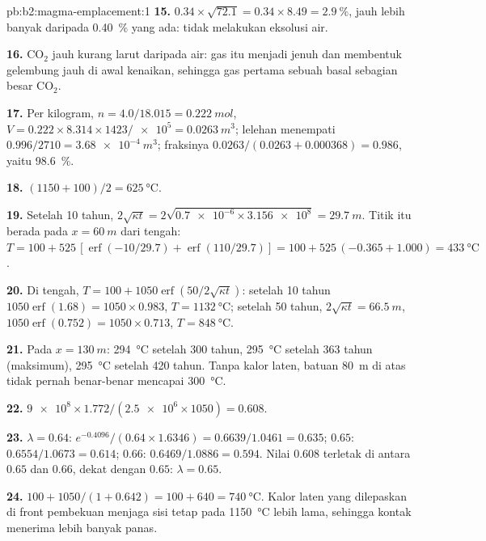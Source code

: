 \begin{solution}{pb:b2:magma-emplacement:1}
\textbf{15.} $0.34\times\sqrt{72.1} = 0.34\times8.49 = \qty{2.9}{\percent}$, jauh lebih banyak daripada
\qty{0.40}{\percent} yang ada:   tidak melakukan eksolusi air.

\textbf{16.} CO$_2$ jauh kurang larut daripada air: gas itu menjadi jenuh dan membentuk gelembung
jauh di awal kenaikan, sehingga gas pertama sebuah basal sebagian besar CO$_2$.

\textbf{17.} Per kilogram, $n = 4.0/18.015 = \qty{0.222}{mol}$, $V = 0.222\times8.314\times1423/
\num{e5} = \qty{0.0263}{m^3}$; lelehan menempati $0.996/2710 = \qty{3.68e-4}{m^3}$;
fraksinya $0.0263/(0.0263 + 0.000368) = 0.986$, yaitu \qty{98.6}{\percent}.

\textbf{18.} $(1150 + 100)/2 = \qty{625}{\celsius}$.

\textbf{19.} Setelah 10 tahun, $2\sqrt{\kappa t} = 2\sqrt{\num{0.7e-6}\times\num{3.156e8}} =
\qty{29.7}{m}$. Titik itu berada pada $x = \qty{60}{m}$ dari tengah: $T = 100 +
525\,[\operatorname{erf}(-10/29.7) + \operatorname{erf}(110/29.7)] = 100 + 525\,(-0.365 +
1.000) = \qty{433}{\celsius}$.

\textbf{20.} Di tengah, $T = 100 + 1050\operatorname{erf}(50/2\sqrt{\kappa t})$: setelah
10 tahun $1050\operatorname{erf}(1.68) = 1050\times0.983$, $T = \qty{1132}{\celsius}$; setelah
50 tahun, $2\sqrt{\kappa t} = \qty{66.5}{m}$, $1050\operatorname{erf}(0.752) = 1050\times0.713$,
$T = \qty{848}{\celsius}$.

\textbf{21.} Pada $x = \qty{130}{m}$: \qty{294}{\celsius} setelah 300 tahun,
\qty{295}{\celsius} setelah 363 tahun (maksimum), \qty{295}{\celsius} setelah 420
tahun. Tanpa kalor laten, batuan \qty{80}{m} di atas  tidak pernah benar-benar
mencapai \qty{300}{\celsius}.

\textbf{22.} $\num{9e8}\times1.772/(\num{2.5e6}\times1050) = 0.608$.

\textbf{23.} $\lambda = 0.64$: $e^{-0.4096}/(0.64\times1.6346) = 0.6639/1.0461 = 0.635$;
$0.65$: $0.6554/1.0673 = 0.614$; $0.66$: $0.6469/1.0886 = 0.594$. Nilai $0.608$
terletak di antara $0.65$ dan $0.66$, dekat dengan $0.65$: $\lambda = 0.65$.

\textbf{24.} $100 + 1050/(1 + 0.642) = 100 + 640 = \qty{740}{\celsius}$. Kalor
laten yang dilepaskan di front pembekuan menjaga sisi  tetap pada
\qty{1150}{\celsius} lebih lama, sehingga kontak menerima lebih banyak panas.


\end{solution}
